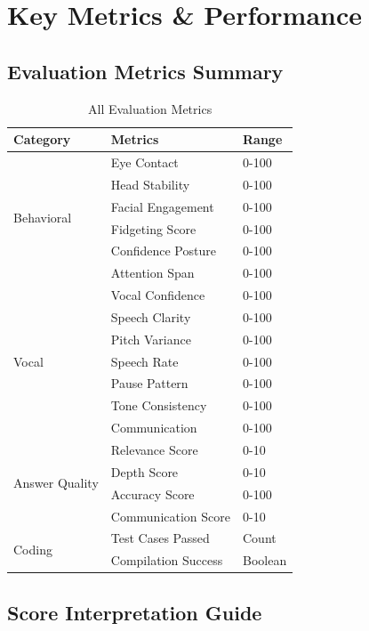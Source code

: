 \documentclass[12pt,a4paper]{article}
\begin{document}
\newpage

\section{Key Metrics \& Performance}

\subsection{Evaluation Metrics Summary}

\begin{table}[h!]
\centering
\begin{tabular}{|l|l|l|}
\hline
\textbf{Category} & \textbf{Metrics} & \textbf{Range} \\
\hline
\multirow{6}{*}{Behavioral} & Eye Contact & 0-100 \\
& Head Stability & 0-100 \\
& Facial Engagement & 0-100 \\
& Fidgeting Score & 0-100 \\
& Confidence Posture & 0-100 \\
& Attention Span & 0-100 \\
\hline
\multirow{7}{*}{Vocal} & Vocal Confidence & 0-100 \\
& Speech Clarity & 0-100 \\
& Pitch Variance & 0-100 \\
& Speech Rate & 0-100 \\
& Pause Pattern & 0-100 \\
& Tone Consistency & 0-100 \\
& Communication & 0-100 \\
\hline
\multirow{4}{*}{Answer Quality} & Relevance Score & 0-10 \\
& Depth Score & 0-10 \\
& Accuracy Score & 0-100 \\
& Communication Score & 0-10 \\
\hline
\multirow{2}{*}{Coding} & Test Cases Passed & Count \\
& Compilation Success & Boolean \\
\hline
\end{tabular}
\caption{All Evaluation Metrics}
\end{table}

\subsection{Score Interpretation Guide}
\end{document}
